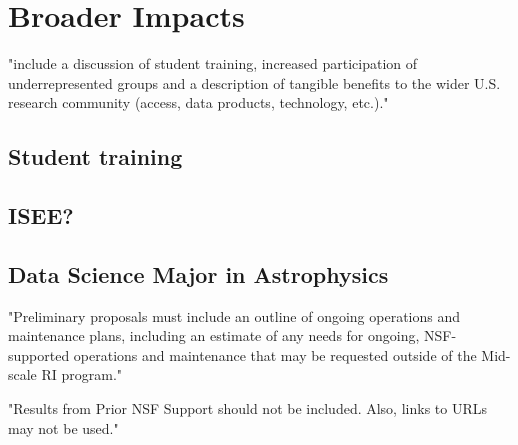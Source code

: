 \documentclass[oneside,11pt]{amsart}
\newcommand{\comment}[2][todo]{{\color{#1}[[{\bf #2}]]}}
\begin{document}
\section{Broader Impacts}
\label{sec:bi}

"include a discussion of student training, increased participation of
underrepresented groups and a description of tangible benefits to the
wider U.S. research community (access, data products, technology,
etc.)."

\subsection{Student training}
\label{sec:training}
\noindent \comment{1/4 page}

\subsection{ISEE?}
\noindent \comment{1/2 page}


% 
% 
% 
% 
% 
% 
% 
% 
% 
% 
% 
% 


\subsection{Data Science Major in Astrophysics}
\noindent \comment{1/4 page}


"Preliminary proposals must include an outline of ongoing operations and
maintenance plans, including an estimate of any needs for ongoing,
NSF-supported operations and maintenance that may be requested outside
of the Mid-scale RI program."

"Results from Prior NSF Support should not be included. Also, links to
URLs may not be used."
\end{document}
